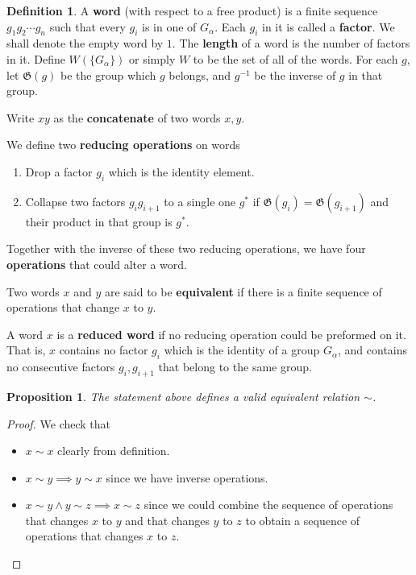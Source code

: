 \documentclass[a4paper]{article}
\theoremstyle{remark}
\theoremstyle{definition}
\theoremstyle{definition}
\newtheorem{definition}{Definition}
\theoremstyle{plain}
\newtheorem{proposition}{Proposition}
\newcommand{\gid}{\mathfrak{G}}
\begin{document}
  \begin{definition}
    A {\bf word} (with respect to a free product) is a finite sequence $g_1 g_2 \cdots g_n$ such that
    every $g_i$ is in one of $G_\alpha$. Each $g_i$ in it is called a {\bf factor}.
    We shall denote the empty word by $1$. The {\bf length}
    of a word is the number of factors in it. Define $W(\{G_\alpha\})$ or simply $W$ 
    to be the set of all of the words. For each $g$, let $\gid(g)$ be the group which $g$ belongs, 
    and $g^{-1}$ be the inverse of $g$ in that group.

    Write $xy$ as the {\bf concatenate} of two words $x, y$.

    We define two {\bf reducing operations} on words
    \begin{enumerate}
      \item Drop a factor $g_i$ which is the identity element.
      \item Collapse two factors $g_i g_{i+1}$ to a single one $g^*$ if $\gid(g_i) = \gid(g_{i+1})$
        and their product in that group is $g^*$.
    \end{enumerate}
    Together with the inverse of these two reducing operations, we have four {\bf operations}
    that could alter a word.

    Two words $x$ and $y$ are said to be {\bf equivalent} if there is a finite sequence of 
    operations that change $x$ to $y$.

    A word $x$ is a {\bf reduced word} if no reducing operation could be preformed on it. That is,
    $x$ contains no factor $g_i$ which is the identity of a group $G_\alpha$, and contains no
    consecutive factors $g_i, g_{i+1}$ that belong to the same group.
  \end{definition}
  \begin{proposition}
    The statement above defines a valid equivalent relation $\sim$.
  \end{proposition}
  \begin{proof}
    We check that
    \begin{itemize}
      \item $x \sim x$ clearly from definition.
      \item $x \sim y \implies y \sim x$ since we have inverse operations.
      \item $x \sim y \land y \sim z \implies x \sim z$ since we could combine the sequence 
        of operations that changes $x$ to $y$ and that changes $y$ to $z$ to obtain a sequence 
        of operations that changes $x$ to $z$.
    \end{itemize}
  \end{proof}
\end{document}
